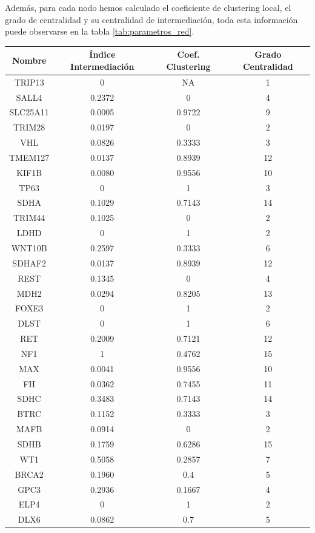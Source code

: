 Además, para cada nodo hemos calculado el coeficiente de clustering local, el grado de centralidad y su centralidad de intermediación, toda esta información puede observarse en la tabla \ref{tab:parametros_red}. 
\begin{table}[ht]
	\centering
	\begin{tabular}{|c|c|c|c|}
		\hline
		\textbf{Nombre} & \textbf{Índice Intermediación} & \textbf{Coef. Clustering} & \textbf{Grado Centralidad}\\ \hline
		TRIP13 & 0 & NA & 1 \\
		SALL4 & 0.2372 & 0 & 4 \\
		SLC25A11 & 0.0005 & 0.9722 & 9 \\
		TRIM28 & 0.0197 & 0 & 2 \\
		VHL & 0.0826 & 0.3333 & 3 \\
		TMEM127 & 0.0137 & 0.8939 & 12 \\
		KIF1B & 0.0080 & 0.9556 & 10 \\
		TP63 & 0 & 1 & 3 \\
		SDHA & 0.1029 & 0.7143 & 14 \\
		TRIM44 & 0.1025 & 0 & 2 \\
		LDHD & 0 & 1 & 2 \\
		WNT10B & 0.2597 & 0.3333 & 6 \\
		SDHAF2 & 0.0137 & 0.8939 & 12 \\
		REST & 0.1345 & 0 & 4 \\
		MDH2 & 0.0294 & 0.8205 & 13 \\
		FOXE3 & 0 & 1 & 2 \\
		DLST & 0 & 1 & 6 \\
		RET & 0.2009 & 0.7121 & 12 \\
		NF1 & 1 & 0.4762 & 15 \\
		MAX & 0.0041 & 0.9556 & 10 \\
		FH & 0.0362 & 0.7455 & 11 \\
		SDHC & 0.3483 & 0.7143 & 14 \\
		BTRC & 0.1152 & 0.3333 & 3 \\
		MAFB & 0.0914 & 0 & 2 \\
		SDHB & 0.1759 & 0.6286 & 15 \\
		WT1 & 0.5058 & 0.2857 & 7 \\
		BRCA2 & 0.1960 & 0.4 & 5 \\
		GPC3 & 0.2936 & 0.1667 & 4 \\
		ELP4 & 0 & 1 & 2 \\
		DLX6 & 0.0862 & 0.7 & 5 \\

\end{tabular}
\end{table}
